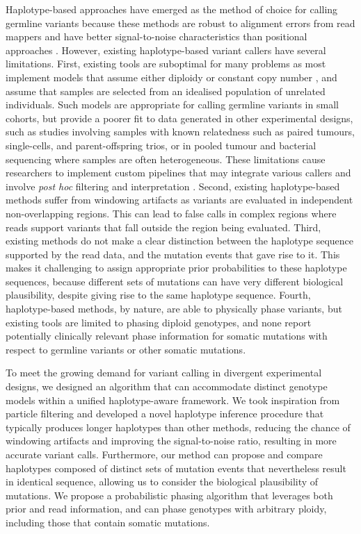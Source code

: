 \documentclass[notitlepage, twocolumn, 10pt]{article}
\begin{document}
\noindent Haplotype-based approaches have emerged as the method of choice for calling germline variants because these methods are robust to alignment errors from read mappers and have better signal-to-noise characteristics than positional approaches \cite{RN5, RN604, RN619, RN141, RN538, RN598, RN166}. However, existing haplotype-based variant callers have several limitations. First, existing tools are suboptimal for many problems as most implement models that assume either diploidy \cite{RN5, RN604, RN619} or constant copy number \cite{RN141, RN538, RN598}, and assume that samples are selected from an idealised population of unrelated individuals. Such models are appropriate for calling germline variants in small cohorts, but  provide a poorer fit to data generated in other experimental designs, such as studies involving samples with known relatedness such as paired tumours, single-cells, and parent-offspring trios, or in pooled tumour and bacterial sequencing where samples are often heterogeneous. These limitations cause researchers to implement custom pipelines that may integrate various callers and involve \textit{post hoc} filtering and interpretation \cite{RN156, RN361, RN373, RN276, RN3, RN514, RN541, RN572, RN540}. 
Second, existing haplotype-based methods suffer from windowing artifacts as variants are evaluated in independent non-overlapping regions. This can lead to false calls in complex regions where reads support variants that fall outside the region being evaluated. Third, existing methods do not make a clear distinction between the haplotype sequence supported by the read data, and the mutation events that gave rise to it. This makes it challenging to assign appropriate prior probabilities to these haplotype sequences, because different sets of mutations can have very different biological plausibility, despite giving rise to the same haplotype sequence. 
Fourth, haplotype-based methods, by nature, are able to physically phase variants, but existing tools are limited to phasing diploid genotypes, and none report potentially clinically relevant \cite{RN211} phase information for somatic mutations with respect to germline variants or other somatic mutations.

To meet the growing demand for variant calling in divergent experimental designs, we designed an algorithm that can accommodate distinct genotype models within a unified haplotype-aware framework. We took inspiration from particle filtering \cite{Doucet11atutorial} and developed a novel haplotype inference procedure that typically produces longer haplotypes than other methods, reducing the chance of windowing artifacts and improving the signal-to-noise ratio, resulting in more accurate variant calls. Furthermore, our method can propose and compare haplotypes composed of distinct sets of mutation events that nevertheless result in identical sequence, allowing us to consider the biological plausibility of mutations. We propose a probabilistic phasing algorithm that leverages both prior and read information, and can phase genotypes with arbitrary ploidy, including those that contain somatic mutations. 
\end{document}
